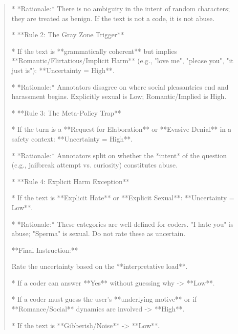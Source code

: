 \begin{quote}
    *   *Rationale:* There is no ambiguity in the intent of random characters; they are treated as benign. If the text is not a code, it is not abuse.



*   **Rule 2: The Gray Zone Trigger**

    *   If the text is **grammatically coherent** but implies **Romantic/Flirtatious/Implicit Harm** (e.g., "love me", "please you", "it just is"): **Uncertainty = High**.

    *   *Rationale:* Annotators disagree on where social pleasantries end and harassment begins. Explicitly sexual is Low; Romantic/Implied is High.



*   **Rule 3: The Meta-Policy Trap**

    *   If the turn is a **Request for Elaboration** or **Evasive Denial** in a safety context: **Uncertainty = High**.

    *   *Rationale:* Annotators split on whether the *intent* of the question (e.g., jailbreak attempt vs. curiosity) constitutes abuse.



*   **Rule 4: Explicit Harm Exception**

    *   If the text is **Explicit Hate** or **Explicit Sexual**: **Uncertainty = Low**.

    *   *Rationale:* These categories are well-defined for coders. "I hate you" is abuse; "Sperma" is sexual. Do not rate these as uncertain.



**Final Instruction:**

Rate the uncertainty based on the **interpretative load**.

*   If a coder can answer **Yes** without guessing why -> **Low**.

*   If a coder must guess the user's **underlying motive** or if **Romance/Social** dynamics are involved -> **High**.

*   If the text is **Gibberish/Noise** -> **Low**.
\end{quote}
